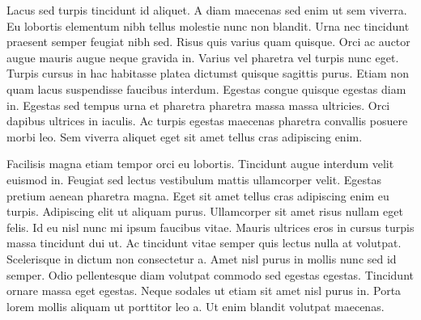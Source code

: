 \documentclass[../main.tex]{subfile}
\begin{document}
Lacus sed turpis tincidunt id aliquet. A diam maecenas sed enim ut sem viverra. Eu lobortis elementum nibh tellus molestie nunc non blandit. Urna nec tincidunt praesent semper feugiat nibh sed. Risus quis varius quam quisque. Orci ac auctor augue mauris augue neque gravida in. Varius vel pharetra vel turpis nunc eget. Turpis cursus in hac habitasse platea dictumst quisque sagittis purus. Etiam non quam lacus suspendisse faucibus interdum. Egestas congue quisque egestas diam in. Egestas sed tempus urna et pharetra pharetra massa massa ultricies. Orci dapibus ultrices in iaculis. Ac turpis egestas maecenas pharetra convallis posuere morbi leo. Sem viverra aliquet eget sit amet tellus cras adipiscing enim.

Facilisis magna etiam tempor orci eu lobortis. Tincidunt augue interdum velit euismod in. Feugiat sed lectus vestibulum mattis ullamcorper velit. Egestas pretium aenean pharetra magna. Eget sit amet tellus cras adipiscing enim eu turpis. Adipiscing elit ut aliquam purus. Ullamcorper sit amet risus nullam eget felis. Id eu nisl nunc mi ipsum faucibus vitae. Mauris ultrices eros in cursus turpis massa tincidunt dui ut. Ac tincidunt vitae semper quis lectus nulla at volutpat. Scelerisque in dictum non consectetur a. Amet nisl purus in mollis nunc sed id semper. Odio pellentesque diam volutpat commodo sed egestas egestas. Tincidunt ornare massa eget egestas. Neque sodales ut etiam sit amet nisl purus in. Porta lorem mollis aliquam ut porttitor leo a. Ut enim blandit volutpat maecenas.
\end{document}
